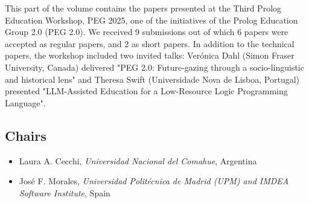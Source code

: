 \documentclass[
]{ceurart}
\begin{document}
\noindent
This part of the volume contains the papers presented at the Third Prolog Education Workshop, PEG 2025, one of the initiatives of the Prolog Education Group 2.0 (PEG 2.0). We received 9 submissions out of which 6 papers were accepted as regular papers, and 2 as short papers. In addition to the technical papers, the workshop included two invited talks: Verónica Dahl (Simon Fraser University, Canada) delivered "PEG 2.0: Future-gazing through a socio-linguistic and historical lens" and Theresa Swift (Universidade Nova de Lisboa, Portugal) presented "LLM-Assisted Education for a Low-Resource Logic Programming Language".


\subsection*{Chairs}
\begin{itemize}
  \item Laura A. Cecchi, \emph{Universidad Nacional del Comahue}, Argentina
  \item José F. Morales, \emph{Universidad Politécnica de Madrid (UPM) and IMDEA Software Institute}, Spain
\end{itemize}
\end{document}
